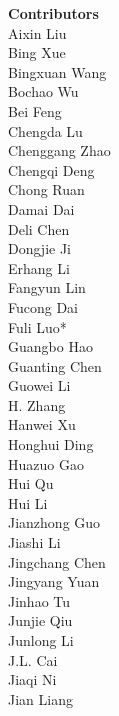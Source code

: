 \documentclass[11pt, a4paper, logo, copyright, nonumbering]{deepseek}
\begin{document}
\begin{multicols}{2}
\noindent
\textbf{\color{damaiblue} Contributors} \\
\color{damaiblue} 
\color{damaiblue} Aixin Liu \\
\color{damaiblue} Bing Xue \\
\color{damaiblue} Bingxuan Wang \\
\color{damaiblue} Bochao Wu \\
\color{damaiblue} Bei Feng \\
\color{damaiblue} Chengda Lu \\
\color{damaiblue} Chenggang Zhao \\
\color{damaiblue} Chengqi Deng \\
\color{damaiblue} Chong Ruan \\
\color{damaiblue} Damai Dai \\
\color{damaiblue} Deli Chen \\
\color{damaiblue} Dongjie Ji \\
\color{damaiblue} Erhang Li \\
\color{damaiblue} Fangyun Lin \\
\color{damaiblue} Fucong Dai \\
\color{damaiblue} Fuli Luo* \\
\color{damaiblue} Guangbo Hao \\
\color{damaiblue} Guanting Chen \\
\color{damaiblue} Guowei Li \\
\color{damaiblue} H. Zhang \\
\color{damaiblue} Hanwei Xu \\
\color{damaiblue} Honghui Ding \\
\color{damaiblue} Huazuo Gao \\
\color{damaiblue} Hui Qu \\
\color{damaiblue} Hui Li \\
\color{damaiblue} Jianzhong Guo \\
\color{damaiblue} Jiashi Li \\
\color{damaiblue} Jingchang Chen \\
\color{damaiblue} Jingyang Yuan \\
\color{damaiblue} Jinhao Tu \\
\color{damaiblue} Junjie Qiu \\
\color{damaiblue} Junlong Li \\
\color{damaiblue} J.L. Cai \\
\color{damaiblue} Jiaqi Ni \\
\color{damaiblue} Jian Liang \\

\end{multicols}
\end{document}
